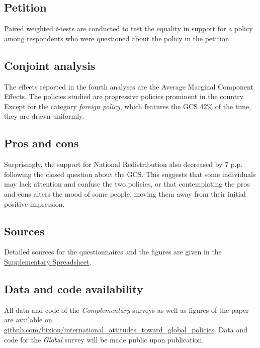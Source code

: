 \documentclass{nature}
\begin{document}
\begin{methods}
\subsection{Petition}
Paired weighted \textit{t}-tests are conducted to test the equality in support for a policy among respondents who were questioned about the policy in the petition.

\subsection{Conjoint analysis}
The effects reported in the fourth analyses are the Average Marginal Component Effects.\cite{hainmueller_causal_2014} The policies studied are progressive policies prominent in the country. Except for the category \textit{foreign policy}, which features the GCS 42\% of the time, they are drawn uniformly.

\subsection{Pros and cons}
Surprisingly, the support for National Redistribution also decreased by 7 p.p. following the closed question about the GCS. This suggests that some individuals may lack attention and confuse the two policies, or that contemplating the pros and cons alters the mood of some people, moving them away from their initial positive impression.

\subsection{Sources}
Detailed sources for the questionnaires and the figures are given in the \href{https://github.com/bixiou/international_attitudes_toward_global_policies/raw/main/questionnaire/specificities.xlsx}{Supplementary Spreadsheet}.

\subsection{\normalsize Data and code availability}

All data and code of the \textit{Complementary} surveys as well as figures of the paper are available on \href{https://github.com/bixiou/international_attitudes_toward_global_policies}{github.com/bixiou/international\_attitudes\_toward\_global\_policies}. Data and code for the \textit{Global} survey will be made public upon publication.

\end{methods} %
\end{document}
